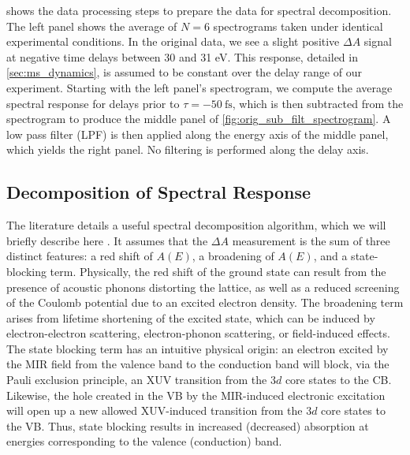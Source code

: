  shows the data processing steps to prepare the data for spectral decomposition. The left panel shows the average of $N=6$ spectrograms taken under identical experimental conditions. In the original data, we see a slight positive $\Delta A$ signal at negative time delays between 30 and 31 eV. This response, detailed in \cref{sec:ms_dynamics}, is assumed to be constant over the delay range of our experiment. Starting with the left panel's spectrogram, we compute the average spectral response for delays prior to $\tau = -50 \ \textrm{fs}$, which is then subtracted from the spectrogram to produce the middle panel of \cref{fig:orig_sub_filt_spectrogram}. A low pass filter (LPF) is then applied along the energy axis of the middle panel, which yields the right panel. No filtering is performed along the delay axis.

\subsection{Decomposition of Spectral Response}
\label{sec:spectral_decomposition}

The literature details a useful spectral decomposition algorithm, which we will briefly describe here \cite{zurchDirectSimultaneousObservation2017}. It assumes that the $\Delta A$ measurement is the sum of three distinct features: a red shift of $A(E)$, a broadening of $A(E)$, and a state-blocking term. Physically, the red shift of the ground state can result from the presence of acoustic phonons distorting the lattice, as well as a reduced screening of the Coulomb potential due to an excited electron density. The broadening term arises from lifetime shortening of the excited state, which can be induced by electron-electron scattering, electron-phonon scattering, or field-induced effects. The state blocking term has an intuitive physical origin: an electron excited by the MIR field from the valence band to the conduction band will block, via the Pauli exclusion principle, an XUV transition from the $3d$ core states to the CB. Likewise, the hole created in the VB by the MIR-induced electronic excitation will open up a new allowed XUV-induced transition from the $3d$ core states to the VB. Thus, state blocking results in increased (decreased) absorption at energies corresponding to the valence (conduction) band.

